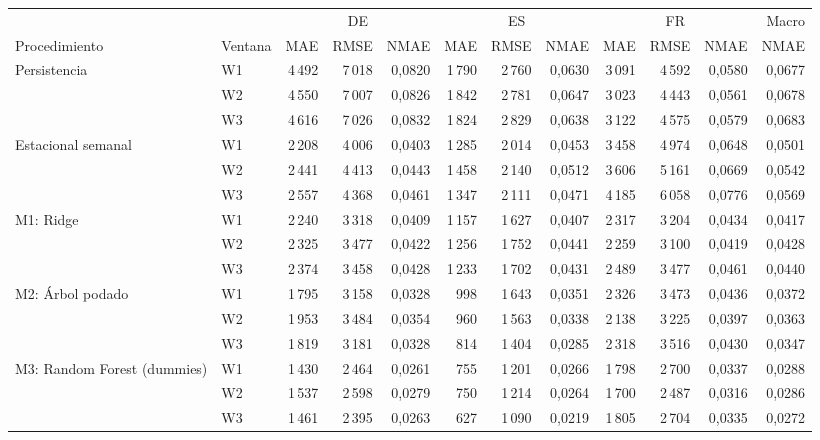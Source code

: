 \begin{tabular}{llrrrrrrrrrr}
\toprule
 & & \multicolumn{3}{c}{DE} & \multicolumn{3}{c}{ES} & \multicolumn{3}{c}{FR} & Macro \\
\cmidrule(lr){3-5}\cmidrule(lr){6-8}\cmidrule(lr){9-11}
Procedimiento & Ventana & MAE & RMSE & NMAE & MAE & RMSE & NMAE & MAE & RMSE & NMAE & NMAE \\
\midrule
Persistencia & W1 & 4\,492 & 7\,018 & 0{,}0820 & 1\,790 & 2\,760 & 0{,}0630 & 3\,091 & 4\,592 & 0{,}0580 & 0{,}0677 \\
 & W2 & 4\,550 & 7\,007 & 0{,}0826 & 1\,842 & 2\,781 & 0{,}0647 & 3\,023 & 4\,443 & 0{,}0561 & 0{,}0678 \\
 & W3 & 4\,616 & 7\,026 & 0{,}0832 & 1\,824 & 2\,829 & 0{,}0638 & 3\,122 & 4\,575 & 0{,}0579 & 0{,}0683 \\
\midrule
Estacional semanal & W1 & 2\,208 & 4\,006 & 0{,}0403 & 1\,285 & 2\,014 & 0{,}0453 & 3\,458 & 4\,974 & 0{,}0648 & 0{,}0501 \\
 & W2 & 2\,441 & 4\,413 & 0{,}0443 & 1\,458 & 2\,140 & 0{,}0512 & 3\,606 & 5\,161 & 0{,}0669 & 0{,}0542 \\
 & W3 & 2\,557 & 4\,368 & 0{,}0461 & 1\,347 & 2\,111 & 0{,}0471 & 4\,185 & 6\,058 & 0{,}0776 & 0{,}0569 \\
\midrule
M1: Ridge & W1 & 2\,240 & 3\,318 & 0{,}0409 & 1\,157 & 1\,627 & 0{,}0407 & 2\,317 & 3\,204 & 0{,}0434 & 0{,}0417 \\
 & W2 & 2\,325 & 3\,477 & 0{,}0422 & 1\,256 & 1\,752 & 0{,}0441 & 2\,259 & 3\,100 & 0{,}0419 & 0{,}0428 \\
 & W3 & 2\,374 & 3\,458 & 0{,}0428 & 1\,233 & 1\,702 & 0{,}0431 & 2\,489 & 3\,477 & 0{,}0461 & 0{,}0440 \\
\midrule
M2: Árbol podado & W1 & 1\,795 & 3\,158 & 0{,}0328 & 998 & 1\,643 & 0{,}0351 & 2\,326 & 3\,473 & 0{,}0436 & 0{,}0372 \\
 & W2 & 1\,953 & 3\,484 & 0{,}0354 & 960 & 1\,563 & 0{,}0338 & 2\,138 & 3\,225 & 0{,}0397 & 0{,}0363 \\
 & W3 & 1\,819 & 3\,181 & 0{,}0328 & 814 & 1\,404 & 0{,}0285 & 2\,318 & 3\,516 & 0{,}0430 & 0{,}0347 \\
\midrule
M3: Random Forest (dummies) & W1 & 1\,430 & 2\,464 & 0{,}0261 & 755 & 1\,201 & 0{,}0266 & 1\,798 & 2\,700 & 0{,}0337 & 0{,}0288 \\
 & W2 & 1\,537 & 2\,598 & 0{,}0279 & 750 & 1\,214 & 0{,}0264 & 1\,700 & 2\,487 & 0{,}0316 & 0{,}0286 \\
 & W3 & 1\,461 & 2\,395 & 0{,}0263 & 627 & 1\,090 & 0{,}0219 & 1\,805 & 2\,704 & 0{,}0335 & 0{,}0272 \\
\bottomrule
\end{tabular}
